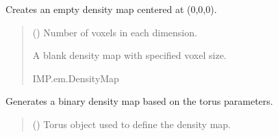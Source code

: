 \documentclass[letterpaper,10pt,english]{sphinxmanual}
\begin{document}
\begin{fulllineitems}
\begin{fulllineitems}
\begin{quote}
\begin{description}
\end{description}\end{quote}

\end{fulllineitems}


\begin{fulllineitems}
\label{\detokenize{src:src.BagelFitter.BagelFitter.create_blank_density_map}}
\pysigstartsignatures
{}
\pysigstopsignatures
\sphinxAtStartPar
Creates an empty density map centered at (0,0,0).
\begin{quote}\begin{description}
\sphinxAtStartPar
{} () \textendash{} Number of voxels in each dimension.

\sphinxAtStartPar
A blank density map with specified voxel size.

\sphinxAtStartPar
IMP.em.DensityMap

\end{description}\end{quote}

\end{fulllineitems}


\begin{fulllineitems}
\label{\detokenize{src:src.BagelFitter.BagelFitter.fill_binary_density}}
\pysigstartsignatures
{}
\pysigstopsignatures
\sphinxAtStartPar
Generates a binary density map based on the torus parameters.
\begin{quote}\begin{description}
\sphinxAtStartPar
{} ({\hyperref[\detokenize{src:src.Torus.Torus}]{}}) \textendash{} Torus object used to define the density map.


\end{description}
\end{quote}
\end{fulllineitems}
\end{fulllineitems}
\end{document}
